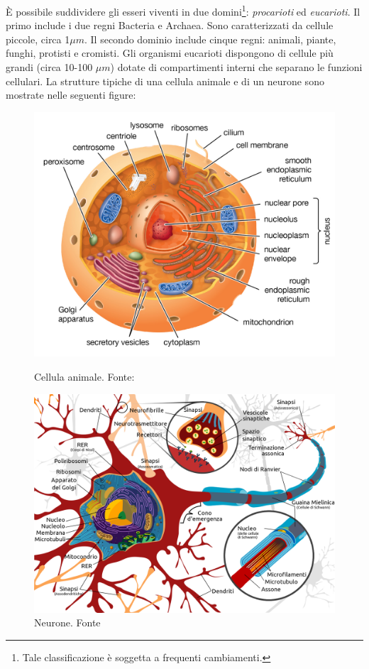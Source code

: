 \par È possibile suddividere gli esseri viventi in due domini\footnote{Tale classificazione è soggetta a frequenti cambiamenti.}: \textit{procarioti} ed \textit{eucarioti}. Il primo include i due regni Bacteria e Archaea. Sono caratterizzati da cellule piccole, circa 1$\mu m$. Il secondo dominio include cinque regni: animali, piante, funghi, protisti e cromisti. Gli organismi eucarioti dispongono di cellule più grandi (circa 10-100 $\mu m$) dotate di compartimenti interni che separano le funzioni cellulari. La strutture tipiche di una cellula animale e di un neurone sono mostrate nelle seguenti figure:

\begin{figure}[!htb]
	\centering
	\includegraphics[scale=0.14]{images/cellula-eucariotica2.png}
	\caption{Cellula animale. Fonte: \cite{eukaryoteBritannica}}
	\label{fig:cellula-animale}
	\endminipage\hfill
	\centering
	\includegraphics[scale=0.155]{images/neurone.png}
	\caption{Neurone. Fonte \cite{neuroneWiki}}
	\label{fig:neurone}
	\endminipage\hfill
\end{figure}

